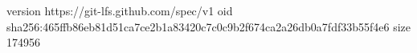 version https://git-lfs.github.com/spec/v1
oid sha256:465ffb86eb81d51ca7ce2b1a83420c7c0c9b2f674ca2a26db0a7fdf33b55f4e6
size 174956
